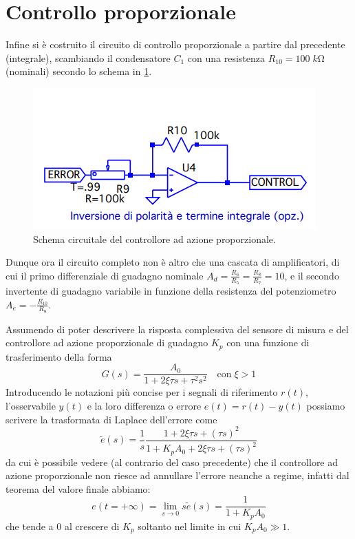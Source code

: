 \documentclass[10pt, a4paper, italian]{article}
\begin{document}
\section*{Controllo proporzionale}
Infine si è costruito il circuito di controllo proporzionale a partire dal
precedente (integrale), scambiando il condensatore $C_1$ con una resistenza
$R_{10} = 100 \; \si{k\ohm}$ (nominali) secondo lo schema in \cref{schm: prop}.
\begin{figure}[htbp]
    \centering
	\includegraphics[scale=0.6]{controlgenprop}
    \caption{Schema circuitale del controllore ad azione proporzionale.
    \label{schm: prop}}
\end{figure}

Dunque ora il circuito completo non è altro che una cascata di
amplificatori, di cui il primo differenziale di guadagno nominale
$A_d = \frac{R_6}{R_5} = \frac{R_8}{R_7} = 10$, e il secondo invertente di
guadagno variabile in funzione della resistenza del potenziometro
$A_e = -\frac{R_{10}}{R_9}$.

Assumendo di poter descrivere la risposta complessiva del sensore di misura e
del controllore ad azione proporzionale di guadagno $K_p$ con una funzione di
trasferimento della forma
\begin{equation}
G(s) = \frac{A_0}{1 + 2\xi \tau s + \tau^2 s^2} \quad \text{con} \; \xi > 1
\end{equation}
Introducendo le notazioni più concise per i segnali di riferimento $r(t)$,
l'osservabile $y(t)$ e la loro differenza o errore $e(t) = r(t) - y(t)$
possiamo scrivere la trasformata di Laplace dell'errore come
\begin{equation}
\tilde{e}(s) = \frac{1}{s} \frac{1 + 2\xi \tau s + (\tau s)^2}
{1 + K_p A_0 + 2 \xi \tau s + (\tau s)^2}
\end{equation}
da cui è possibile vedere (al contrario del caso precedente) che il
controllore ad azione proporzionale non riesce ad annullare l'errore neanche
a regime, infatti dal teorema del valore finale abbiamo:
\begin{equation}\label{eq: Pfv}
e (t = +\infty) = \lim_{s \to 0} s \tilde{e}(s) = \frac{1}{1 + K_p A_0}
\end{equation}
che tende a 0 al crescere di $K_p$ soltanto nel limite in cui $K_p A_0 \gg 1$.
\end{document}
